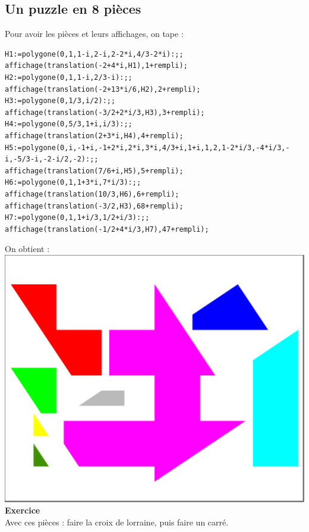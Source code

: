 \documentclass[a4paper,11pt]{book}
\begin{document}
\subsection{Un puzzle en 8 pi\`eces}
Pour avoir les  pi\`eces et leurs affichages, on tape :
\begin{verbatim}
H1:=polygone(0,1,1-i,2-i,2-2*i,4/3-2*i):;;
affichage(translation(-2+4*i,H1),1+rempli);
H2:=polygone(0,1,1-i,2/3-i):;;
affichage(translation(-2+13*i/6,H2),2+rempli);
H3:=polygone(0,1/3,i/2):;;
affichage(translation(-3/2+2*i/3,H3),3+rempli);
H4:=polygone(0,5/3,1+i,i/3):;;
affichage(translation(2+3*i,H4),4+rempli);
H5:=polygone(0,i,-1+i,-1+2*i,2*i,3*i,4/3+i,1+i,1,2,1-2*i/3,-4*i/3,-i,-5/3-i,-2-i/2,-2):;;
affichage(translation(7/6+i,H5),5+rempli);
H6:=polygone(0,1,1+3*i,7*i/3):;;
affichage(translation(10/3,H6),6+rempli);
affichage(translation(-3/2,H3),68+rempli);
H7:=polygone(0,1,1+i/3,1/2+i/3):;;
affichage(translation(-1/2+4*i/3,H7),47+rempli);
\end{verbatim}
On obtient :\\

\includegraphics[width=\textwidth]{puzzlecroix16}
{\bf Exercice}\\
 Avec ces pi\`eces :
faire la croix de lorraine, puis faire un carr\'e.\\
\end{document}
